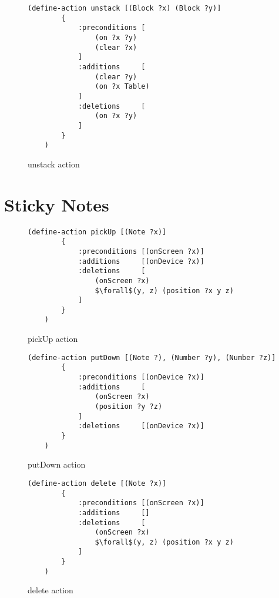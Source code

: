 \begin{figure}[ht]
\begin{lstlisting}[]
    (define-action unstack [(Block ?x) (Block ?y)]
        {
            :preconditions [
                (on ?x ?y)
                (clear ?x)
            ]
            :additions     [
                (clear ?y)
                (on ?x Table)
            ]
            :deletions     [
                (on ?x ?y)
            ]
        }
    )
\end{lstlisting}
\caption{unstack action}
\end{figure}

\section{Sticky Notes}

\begin{figure}[h!]
\begin{lstlisting}[mathescape=true]
    (define-action pickUp [(Note ?x)]
        {
            :preconditions [(onScreen ?x)]
            :additions     [(onDevice ?x)]
            :deletions     [
                (onScreen ?x)
                $\forall$(y, z) (position ?x y z)
            ]
        }
    )
\end{lstlisting}
\caption{pickUp action}
\end{figure}

\begin{figure}[hb]
\begin{lstlisting}[]
    (define-action putDown [(Note ?), (Number ?y), (Number ?z)]
        {
            :preconditions [(onDevice ?x)]
            :additions     [
                (onScreen ?x)
                (position ?y ?z)
            ]
            :deletions     [(onDevice ?x)]
        }
    )
\end{lstlisting}
\caption{putDown action}
\end{figure}

\begin{figure}[h!]
\begin{lstlisting}[mathescape=true]
    (define-action delete [(Note ?x)]
        {
            :preconditions [(onScreen ?x)]
            :additions     []
            :deletions     [
                (onScreen ?x)
                $\forall$(y, z) (position ?x y z)
            ]
        }
    )
\end{lstlisting}
\caption{delete action}
\end{figure}